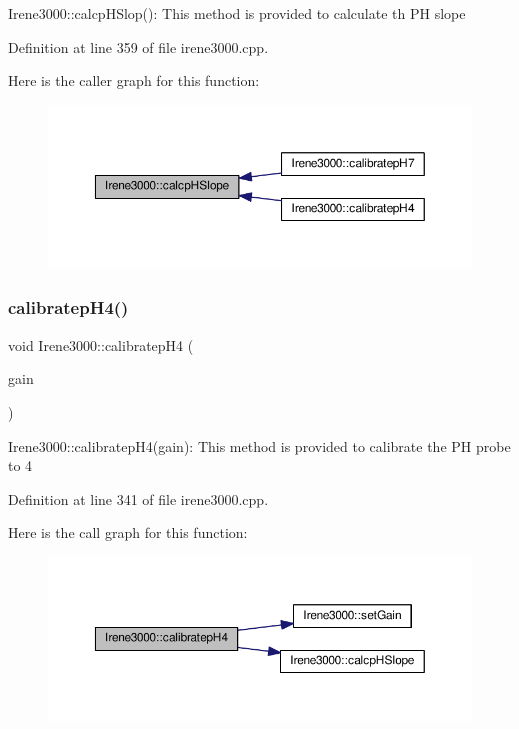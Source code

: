 Irene3000\+::calcp\+H\+Slop()\+: This method is provided to calculate th PH slope 

Definition at line 359 of file irene3000.\+cpp.

Here is the caller graph for this function\+:
\nopagebreak
\begin{figure}[H]
\begin{center}
\leavevmode
\includegraphics[width=350pt]{d6/d03/class_irene3000_a81f6a79e546679692053f7ac1af49613_icgraph}
\end{center}
\end{figure}
\mbox{\label{class_irene3000_a9772eeea2305fad6236a82e33e93892e}} 
\subsubsection{\texorpdfstring{calibratep\+H4()}{calibratepH4()}}
{\footnotesize\ttfamily void Irene3000\+::calibratep\+H4 (\begin{DoxyParamCaption}\item[{ads\+Gain\+\_\+t}]{gain }\end{DoxyParamCaption})}

Irene3000\+::calibratep\+H4(gain)\+: This method is provided to calibrate the PH probe to 4 

Definition at line 341 of file irene3000.\+cpp.

Here is the call graph for this function\+:
\nopagebreak
\begin{figure}[H]
\begin{center}
\leavevmode
\includegraphics[width=350pt]{d6/d03/class_irene3000_a9772eeea2305fad6236a82e33e93892e_cgraph}
\end{center}
\end{figure}
\mbox{\label{class_irene3000_a2e810ddfa8b95eaa2446a408761c6bdc}} 
